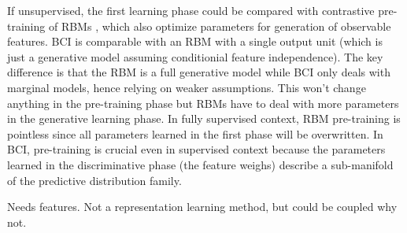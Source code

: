 \documentclass[english]{scrartcl}
\begin{document}
If unsupervised, the first learning phase could be compared with contrastive pre-training of RBMs \cite{Hinton-06,Fischer-14}, which also optimize parameters for generation of observable features. BCI is comparable with an RBM with a single output unit (which is just a generative model assuming conditionial feature independence). The key difference is that the RBM is a full generative model while BCI only deals with marginal models, hence relying on weaker assumptions. This won't change anything in the pre-training phase but RBMs have to deal with more parameters in the generative learning phase. In fully supervised context, RBM pre-training is pointless since all parameters learned in the first phase will be overwritten. In BCI, pre-training is crucial even in supervised context because the parameters learned in the discriminative phase (the feature weighs) describe a sub-manifold of the predictive distribution family.

Needs features. Not a representation learning method, but could be coupled why not.





\end{document}
